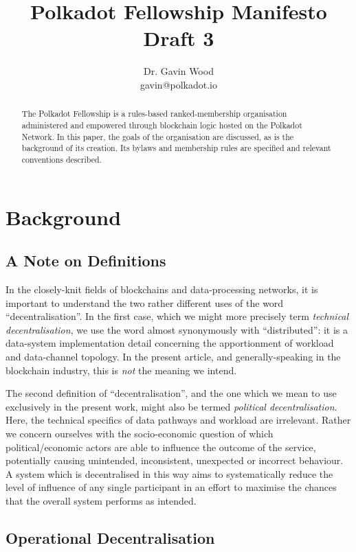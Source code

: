 \documentclass[9pt,oneside]{amsart}
\title{Polkadot Fellowship Manifesto \\ {\smaller \textbf{Draft 3}}}
\author{ Dr. Gavin Wood\\ gavin@polkadot.io}
\begin{document}
\begin{abstract}

The Polkadot Fellowship is a rules-based ranked-membership organisation administered and empowered
through blockchain logic hosted on the Polkadot Network. In this paper, the goals of the organisation are discussed, as is the background of its creation. Its bylaws and membership rules are specified and relevant conventions described.

\end{abstract}

\maketitle

\section{Background}\label{background}

\subsection{A Note on Definitions}

In the closely-knit fields of blockchains and data-processing networks, it is important to understand the two rather different uses of the word ``decentralisation''. In the first case, which we might more precisely term \emph{technical decentralisation}, we use the word almost synonymously with ``distributed'': it is a data-system implementation detail concerning the apportionment of workload and data-channel topology. In the present article, and generally-speaking in the blockchain industry, this is \emph{not} the meaning we intend.

The second definition of ``decentralisation'', and the one which we mean to use exclusively in the present work, might also be termed \emph{political decentralisation}. Here, the technical specifics of data pathways and workload are irrelevant. Rather we concern ourselves with the socio-economic question of which political/economic actors are able to influence the outcome of the service, potentially causing unintended, inconsistent, unexpected or incorrect behaviour. A system which is decentralised in this way aims to systematically reduce the level of influence of any single participant in an effort to maximise the chances that the overall system performs as intended.

\subsection{Operational Decentralisation}
\end{document}
